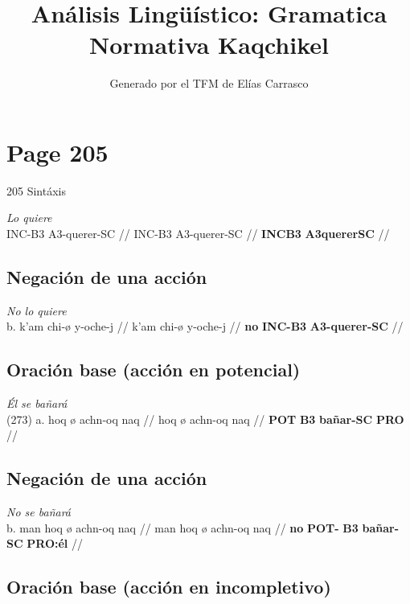 \documentclass{article}%
\title{Análisis Lingüístico: Gramatica Normativa Kaqchikel}%
\author{Generado por el TFM de Elías Carrasco}%
\begin{document}
%
\normalsize%
\maketitle%
\section{Page 205}%
\label{sec:Page205}%
205 Sintáxis %
\par\medskip%
\ex
\textit{Lo quiere} \\
\begingl
\gla INC-B3 A3-querer-SC //
\glb INC-B3 A3-querer-SC //
\glc \textbf{INC}\textbf{B3} \textbf{A3}\textbf{querer}\textbf{SC} //
\endgl
\xe
%
\medskip%
\subsection{Negación de una acción}%
\label{subsec:Negacindeunaaccin}%

%
\par\medskip%
\ex
\textit{No lo quiere} \\
\begingl
\gla b. k’am chi-ø y-oche-j //
\glb k’am chi-ø y-oche-j //
\glc \textbf{no} \textbf{INC-}\textbf{B3} \textbf{A3-}\textbf{querer-}\textbf{SC} //
\endgl
\xe
%
\medskip%
\subsection{Oración base (acción en potencial)}%
\label{subsec:Oracinbase(accinenpotencial)}%

%
\par\medskip%
\ex
\textit{Él se bañará} \\
\begingl
\gla (273) a. hoq ø achn-oq naq //
\glb hoq ø achn-oq naq //
\glc \textbf{POT} \textbf{B3} \textbf{bañar-}\textbf{SC} \textbf{PRO} //
\endgl
\xe
%
\medskip%
\subsection{Negación de una acción}%
\label{subsec:Negacindeunaaccin}%

%
\par\medskip%
\ex
\textit{No se bañará} \\
\begingl
\gla b. man hoq ø achn-oq naq //
\glb man hoq ø achn-oq naq //
\glc \textbf{no} \textbf{POT-} \textbf{B3} \textbf{bañar-}\textbf{SC} \textbf{PRO:él} //
\endgl
\xe
%
\medskip%
\subsection{Oración base (acción en incompletivo)}%
\label{subsec:Oracinbase(accinenincompletivo)}%
\end{document}
